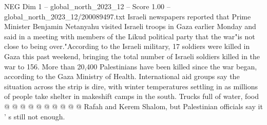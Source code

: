 \begin{textsample}{NEG Dim 1 – global\_north\_2023\_12 – Score 1.00 – global\_north\_2023\_12/200089497.txt}
Israeli newspapers reported that Prime Minister Benjamin Netanyahu visited Israeli troops in Gaza earlier Monday and said in a meeting with members of the Likud political party that the war"is not close to being over."According to the Israeli military, 17 soldiers were killed in Gaza this past weekend, bringing the total number of Israeli soldiers killed in the war to 156.
More than 20,400 Palestinians have been killed since the war began, according to the Gaza Ministry of Health.
International aid groups say the situation across the strip is dire, with winter temperatures settling in as millions of people take shelter in makeshift camps in the south.
Trucks full of water, food @ @ @ @ @ @ @ @ @ @ Rafah and Kerem Shalom, but Palestinian officials say it ' s still not enough.

\end{textsample}
